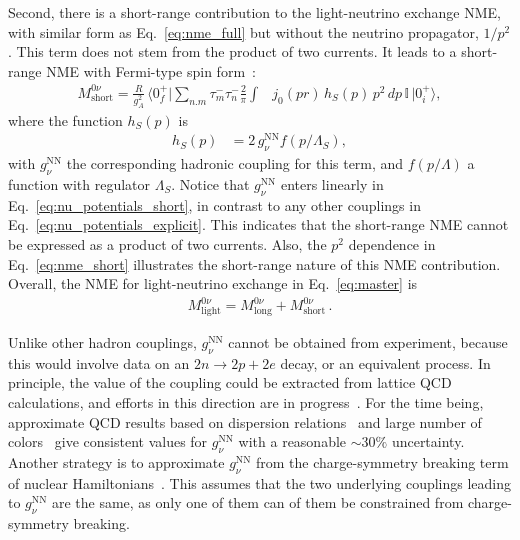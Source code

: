 Second, there is a short-range contribution to the light-neutrino exchange NME, with similar form as Eq.~\eqref{eq:nme_full} but without the neutrino propagator, $1/p^2$. This term does not stem from the product of two currents. It leads to a short-range NME with Fermi-type spin form~\cite{Cirigliano:2019vdj}:
\begin{align}
\label{eq:nme_short}
  M^{0\nu}_\text{short} = \frac{R}{g_A^2}\,
  \langle 0^+_f\rvert
  \sum_{n.m}
  \tau^-_m\tau^-_n \frac{2}{\pi}\int
    &j_0(pr)\,h_S(p)\,p^2\,d p\,\mathbb{I}\,
  \lvert 0^+_i\rangle, %
\end{align}
where the function $h_S(p)$ is
\begin{align}
\label{eq:nu_potentials_short}
h_{S}(p)&=2\,g^\text{NN}_\nu f(p/\Lambda_S),
\end{align}
with $g^\text{NN}_\nu$ the corresponding hadronic coupling for this term, and $f(p/\Lambda)$ a function with regulator $\Lambda_S$. Notice that $g^\text{NN}_\nu$ enters linearly in Eq.~\eqref{eq:nu_potentials_short}, in contrast to  any other couplings in  Eq.~\eqref{eq:nu_potentials_explicit}. This indicates that the short-range NME cannot be expressed as a product of two currents. Also, the $p^2$ dependence in Eq.~\eqref{eq:nme_short} illustrates the short-range nature of this NME contribution. Overall, the NME for light-neutrino exchange in Eq.~\eqref{eq:master} is
\begin{align}
M^{0\nu}_\text{light}=M^{0\nu}_\text{long}+M^{0\nu}_\text{short}\,.
\label{eq:nme_total}
\end{align}

Unlike other hadron couplings, $g^\text{NN}_\nu$ cannot be obtained from experiment, because this would involve data on an $2n\rightarrow2p+2e$ decay, or an equivalent process. In principle, the value of the coupling could be extracted from lattice QCD calculations, and efforts in this direction are in progress~\cite{Davoudi:2020gxs,Davoudi:2021noh}. For the time being, approximate QCD results based on dispersion relations~\cite{Cirigliano:2020dmx,Cirigliano:2021qko} and large number of colors~\cite{Richardson:2021xiu} give consistent values for $g^\text{NN}_\nu$ with a reasonable $\sim30\%$ uncertainty. Another strategy is to approximate $g^\text{NN}_\nu$ from the charge-symmetry breaking term of nuclear Hamiltonians~\cite{Cirigliano:2019vdj}. This assumes that the two underlying couplings leading to $g^\text{NN}_\nu$ are the same, as only one of them can of them be constrained from charge-symmetry breaking.

